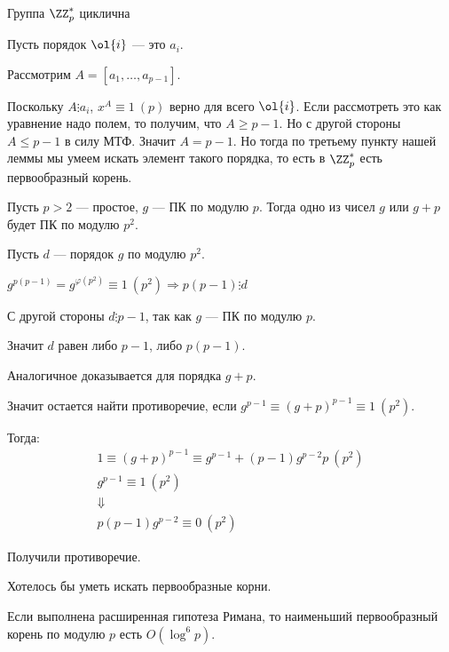 \begin{coroll}{}{}
    Группа \( \ZZ_p^* \) циклична
\end{coroll}

Пусть порядок \( \ol{i} \) --- это \( a_i \).

Рассмотрим \( A = [a_1, \ldots, a_{p - 1}] \).

Поскольку \( A \vdots a_i \), \( x^{A} \equiv 1 \: (p) \) верно для всего \( \ol{i} \).
Если рассмотреть это как уравнение надо полем, то получим, что \( A \geq p - 1 \).
Но с другой стороны \( A \leq p - 1 \) в силу МТФ.
Значит \( A = p - 1 \).
Но тогда по третьему пункту нашей леммы мы умеем искать элемент такого порядка,
то есть в \( \ZZ_p^* \) есть первообразный корень.

\begin{lemma}{}{}
    Пусть \( p > 2 \) --- простое, \( g \) --- ПК по модулю \( p \).
    Тогда одно из чисел \( g \) или \( g + p \) будет ПК по модулю \( p^2 \).
\end{lemma}

Пусть \( d \) --- порядок \( g \) по модулю \( p^2 \).

\( g^{p(p - 1)} = g^{\varphi(p^2)} \equiv 1 \: (p^2) \Rightarrow p(p - 1) \vdots d \)

С другой стороны \( d \vdots p - 1 \), так как \( g \) --- ПК по модулю \( p \).

Значит \( d \) равен либо \( p - 1 \), либо \( p(p - 1) \).

Аналогичное доказывается для порядка \( g + p \).

Значит остается найти противоречие, если \( g^{p - 1} \equiv (g + p)^{p - 1} \equiv 1 \: (p^2) \).

Тогда:
\begin{gather*}
    1 \equiv (g + p)^{p - 1} \equiv g^{p - 1} + (p - 1)g^{p - 2}p \: (p^2)
    \\
    g^{p - 1} \equiv 1 \: (p^2)
    \\
    \Downarrow
    \\
    p(p - 1) g^{p - 2} \equiv 0 \: (p^2)
\end{gather*}

Получили противоречие.

\begin{remark}{}{}
    Хотелось бы уметь искать первообразные корни.

    Если выполнена расширенная гипотеза Римана, то наименьший первообразный корень по модулю \( p \) есть \( O(\log^6 p) \).
\end{remark}

